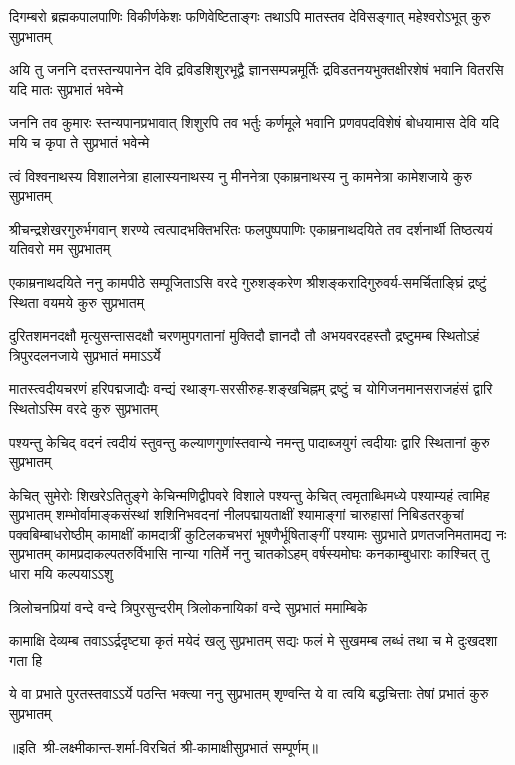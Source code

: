 \fourlineindentedshloka
{दिगम्बरो ब्रह्मकपालपाणिः}
{विकीर्णकेशः फणिवेष्टिताङ्गः}
{तथाऽपि मातस्तव देविसङ्गात्}
{महेश्वरोऽभूत् कुरु सुप्रभातम्}

\fourlineindentedshloka
{अयि तु जननि दत्तस्तन्यपानेन देवि}
{द्रविडशिशुरभूद्वै ज्ञानसम्पन्नमूर्तिः}
{द्रविडतनयभुक्तक्षीरशेषं भवानि}
{वितरसि यदि मातः सुप्रभातं भवेन्मे}

\fourlineindentedshloka
{जननि तव कुमारः स्तन्यपानप्रभावात्}
{शिशुरपि तव भर्तुः कर्णमूले भवानि}
{प्रणवपदविशेषं बोधयामास देवि}
{यदि मयि च कृपा ते सुप्रभातं भवेन्मे}

\fourlineindentedshloka
{त्वं विश्वनाथस्य विशालनेत्रा}
{हालास्यनाथस्य नु मीननेत्रा}
{एकाम्रनाथस्य नु कामनेत्रा}
{कामेशजाये कुरु सुप्रभातम्}

\fourlineindentedshloka
{श्रीचन्द्रशेखरगुरुर्भगवान् शरण्ये}
{त्वत्पादभक्तिभरितः फलपुष्पपाणिः}
{एकाम्रनाथदयिते तव दर्शनार्थी}
{तिष्ठत्ययं यतिवरो मम सुप्रभातम्}

\fourlineindentedshloka
{एकाम्रनाथदयिते ननु कामपीठे}
{सम्पूजिताऽसि वरदे गुरुशङ्करेण}
{श्रीशङ्करादिगुरुवर्य-समर्चिताङ्घ्रिं}
{द्रष्टुं स्थिता वयमये कुरु सुप्रभातम्}

\fourlineindentedshloka
{दुरितशमनदक्षौ मृत्युसन्तासदक्षौ}
{चरणमुपगतानां मुक्तिदौ ज्ञानदौ तौ}
{अभयवरदहस्तौ द्रष्टुमम्ब स्थितोऽहं}
{त्रिपुरदलनजाये सुप्रभातं ममाऽऽर्ये}

\fourlineindentedshloka
{मातस्त्वदीयचरणं हरिपद्मजाद्यैः}
{वन्द्यं रथाङ्ग-सरसीरुह-शङ्खचिह्नम्}
{द्रष्टुं च योगिजनमानसराजहंसं}
{द्वारि स्थितोऽस्मि वरदे कुरु सुप्रभातम्}

\fourlineindentedshloka
{पश्यन्तु केचिद् वदनं त्वदीयं}
{स्तुवन्तु कल्याणगुणांस्तवान्ये}
{नमन्तु पादाब्जयुगं त्वदीयाः}
{द्वारि स्थितानां कुरु सुप्रभातम्}

\fourlineindentedshloka
{केचित् सुमेरोः शिखरेऽतितुङ्गे}
{केचिन्मणिद्वीपवरे विशाले}
{पश्यन्तु केचित् त्वमृताब्धिमध्ये}
{पश्याम्यहं त्वामिह सुप्रभातम्}
\setlength{\shlokaspaceskip}{16pt}
\fourlineindentedshloka
{शम्भोर्वामाङ्कसंस्थां शशिनिभवदनां नीलपद्मायताक्षीं}
{श्यामाङ्गां चारुहासां निबिडतरकुचां पक्वबिम्बाधरोष्ठीम्}
{कामाक्षीं कामदात्रीं कुटिलकचभरां भूषणैर्भूषिताङ्गीं}
{पश्यामः सुप्रभाते प्रणतजनिमतामद्य नः सुप्रभातम्}
\setlength{\shlokaspaceskip}{24pt}
\fourlineindentedshloka
{कामप्रदाकल्पतरुर्विभासि}
{नान्या गतिर्मे ननु चातकोऽहम्}
{वर्षस्यमोघः कनकाम्बुधाराः}
{काश्चित् तु धारा मयि कल्पयाऽऽशु}

\twolineshloka
{त्रिलोचनप्रियां वन्दे वन्दे त्रिपुरसुन्दरीम्}
{त्रिलोकनायिकां वन्दे सुप्रभातं ममाम्बिके}

\fourlineindentedshloka
{कामाक्षि देव्यम्ब तवाऽऽर्द्रदृष्ट्या}
{कृतं मयेदं खलु सुप्रभातम्}
{सद्यः फलं मे सुखमम्ब लब्धं}
{तथा च मे दुःखदशा गता हि}

\fourlineindentedshloka
{ये वा प्रभाते पुरतस्तवाऽऽर्ये}
{पठन्ति भक्त्या ननु सुप्रभातम्}
{शृण्वन्ति ये वा त्वयि बद्धचित्ताः}
{तेषां प्रभातं कुरु सुप्रभातम्}

॥इति~श्री-लक्ष्मीकान्त-शर्मा-विरचितं श्री-कामाक्षीसुप्रभातं सम्पूर्णम्॥